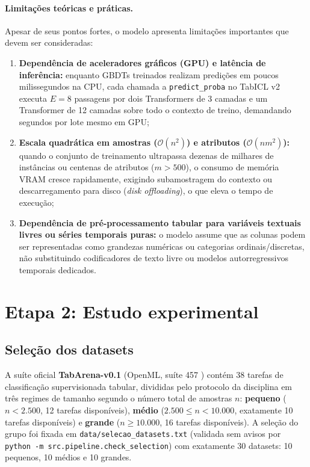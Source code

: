 \documentclass[11pt,a4paper]{article}
\begin{document}
\paragraph{Limitações teóricas e práticas.}
Apesar de seus pontos fortes, o modelo apresenta limitações importantes que devem ser consideradas:
\begin{enumerate}[leftmargin=2em]
    \item \textbf{Dependência de aceleradores gráficos (GPU) e latência de inferência:} enquanto GBDTs treinados realizam predições em poucos milissegundos na CPU, cada chamada a \texttt{predict\_proba} no TabICL v2 executa $E = 8$ passagens por dois Transformers de 3 camadas e um Transformer de 12 camadas sobre todo o contexto de treino, demandando segundos por lote mesmo em GPU;
    \item \textbf{Escala quadrática em amostras ($\mathcal{O}(n^2)$) e atributos ($\mathcal{O}(n m^2)$):} quando o conjunto de treinamento ultrapassa dezenas de milhares de instâncias ou centenas de atributos ($m > 500$), o consumo de memória VRAM cresce rapidamente, exigindo subamostragem do contexto ou descarregamento para disco (\emph{disk offloading}), o que eleva o tempo de execução;
    \item \textbf{Dependência de pré-processamento tabular para variáveis textuais livres ou séries temporais puras:} o modelo assume que as colunas podem ser representadas como grandezas numéricas ou categorias ordinais/discretas, não substituindo codificadores de texto livre ou modelos autorregressivos temporais dedicados.
\end{enumerate}

\section{Etapa 2: Estudo experimental}
\label{sec:etapa2}

\subsection{Seleção dos datasets}
\label{sec:selecao}

A suíte oficial \textbf{TabArena-v0.1} (OpenML, suíte 457 \cite{erickson2025tabarena}) contém 38 tarefas de classificação supervisionada tabular, divididas pelo protocolo da disciplina em três regimes de tamanho segundo o número total de amostras $n$: \textbf{pequeno} ($n < 2.500$, 12 tarefas disponíveis), \textbf{médio} ($2.500 \le n < 10.000$, exatamente 10 tarefas disponíveis) e \textbf{grande} ($n \ge 10.000$, 16 tarefas disponíveis). A seleção do grupo foi fixada em \texttt{data/selecao\_datasets.txt} (validada sem avisos por \texttt{python -m src.pipeline.check\_selection}) com exatamente 30 datasets: 10 pequenos, 10 médios e 10 grandes.
\end{document}
